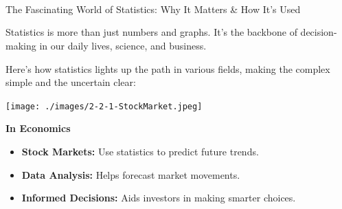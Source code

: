 \documentclass[final]{beamer}
\begin{document}
\begin{frame}[t]{}
\begin{columns}[t]
\begin{column}{.33\textwidth}
			\vspace{-0.82cm}

			\begin{block}{}
				\centering
				\Large \textbf{\inserttitle}\\

				\vspace{1cm}

				\normalsize \insertauthor\\

				\vspace{1cm}

				\small \textit{\insertinstitute}\\

				\vspace{1cm}

			\end{block}

			\vspace{0.5cm}

			\begin{block}{The Fascinating World of Statistics: Why It Matters \& How It's Used}

				Statistics is more than just numbers and graphs. It's the backbone of decision-making in our daily lives, science, and business.

				\vspace{0.5cm}

				Here's how statistics lights up the path in various fields, making the complex simple and the uncertain clear:

				\vspace{2cm}

				\begin{minipage}{0.28\textwidth}
					\centering
					\texttt{[image: ./images/2-2-1-StockMarket.jpeg]}
				\end{minipage}
				\hfill
				\begin{minipage}{0.71\textwidth}
					\textbf{In Economics}
					\begin{itemize}
						\item \textbf{Stock Markets:} Use statistics to predict future trends.
						\item \textbf{Data Analysis:} Helps forecast market movements.
						\item \textbf{Informed Decisions:} Aids investors in making smarter choices.
					\end{itemize}
				\end{minipage}


\end{block}
\end{column}
\end{columns}
\end{frame}
\end{document}
